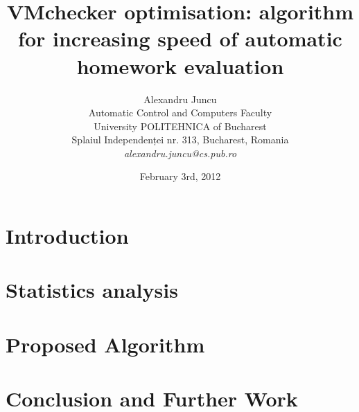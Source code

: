 \documentclass[12pt]{article}
\title{VMchecker optimisation: algorithm for increasing speed of automatic
homework evaluation}
\author{Alexandru Juncu\\
Automatic Control and Computers Faculty\\
University POLITEHNICA of Bucharest\\
Splaiul Independenței nr. 313, Bucharest, Romania \\
\emph{alexandru.juncu@cs.pub.ro}}
\date{February 3rd, 2012}
\begin{document}
\maketitle

\begin{abstract}

\end{abstract}
\pagebreak
\section{Introduction}
\label{sec:introduction}


\pagebreak
\section{Statistics analysis}
\label{sec:statistics}


\pagebreak
\section{Proposed Algorithm}
\label{sec:implementation}


\section{Conclusion and Further Work}
\label{sec:conclusion}





\end{document}
